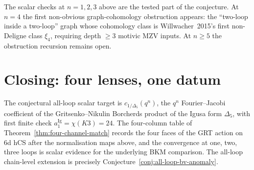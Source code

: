 The scalar checks at $n = 1, 2, 3$ above are the tested part of the
conjecture. At $n = 4$ the first non-obvious graph-cohomology
obstruction appears: the
``two-loop inside a two-loop'' graph whose cohomology class
is Willwacher~2015's
first non-Deligne class $\xi_4$, requiring depth $\geq 3$ motivic
MZV inputs. At $n \geq 5$ the obstruction recursion remains open.

\section{Closing: four lenses, one datum}

The conjectural all-loop scalar target is
$c_{1/\Delta_5}(q^n)$, the $q^{n}$ Fourier--Jacobi coefficient of the
Gritsenko--Nikulin Borcherds product of the Igusa form $\Delta_5$,
with first finite check $a_1^{\mathrm{Ig}}=\chi(K3)=24$.
The four-column table of
Theorem~\ref{thm:four-channel-match} records the four faces of the GRT
action on 6d hCS after the normalisation maps above, and the
convergence at one, two, three loops is scalar evidence for the
underlying BKM comparison. The all-loop chain-level extension is
precisely Conjecture~\ref{conj:all-loop-bv-anomaly}.

